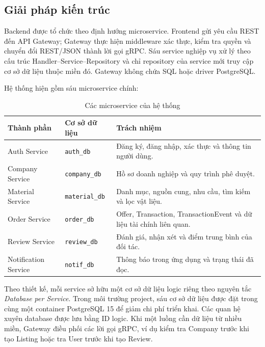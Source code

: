 \documentclass[12pt,a4paper,oneside]{report}
\begin{document}
\subsection{Giải pháp kiến trúc}

Backend được tổ chức theo định hướng microservice. Frontend gửi yêu cầu REST đến
API Gateway; Gateway thực hiện middleware xác thực, kiểm tra quyền và chuyển đổi
REST/JSON thành lời gọi gRPC. Sáu service nghiệp vụ xử lý theo cấu trúc
Handler--Service--Repository và chỉ repository của service mới truy cập cơ sở dữ
liệu thuộc miền đó. Gateway không chứa SQL hoặc driver PostgreSQL.

Hệ thống hiện gồm sáu microservice chính:

\begin{table}[htbp]
  \centering
  \caption{Các microservice của hệ thống}
  \label{tab:danh-sach-microservice}
  \begin{tabularx}{\textwidth}{p{3.4cm}p{2.6cm}Y}
    \toprule
    \textbf{Thành phần} & \textbf{Cơ sở dữ liệu} & \textbf{Trách nhiệm} \\
    \midrule
    Auth Service & \texttt{auth\_db} &
    Đăng ký, đăng nhập, xác thực và thông tin người dùng. \\

    Company Service & \texttt{company\_db} &
    Hồ sơ doanh nghiệp và quy trình phê duyệt. \\

    Material Service & \texttt{material\_db} &
    Danh mục, nguồn cung, nhu cầu, tìm kiếm và lọc vật liệu. \\

    Order Service & \texttt{order\_db} &
    Offer, Transaction, TransactionEvent và dữ liệu tài chính liên quan. \\

    Review Service & \texttt{review\_db} &
    Đánh giá, nhận xét và điểm trung bình của đối tác. \\

    Notification Service & \texttt{notif\_db} &
    Thông báo trong ứng dụng và trạng thái đã đọc. \\
    \bottomrule
  \end{tabularx}
\end{table}

Theo thiết kế, mỗi service sở hữu một cơ sở dữ liệu logic riêng theo nguyên tắc
\textit{Database per Service}. Trong môi trường project, sáu cơ sở dữ liệu được
đặt trong cùng một container PostgreSQL 15 để giảm chi phí triển khai. Các quan
hệ xuyên database được lưu bằng ID logic. Khi một luồng cần dữ liệu từ nhiều
miền, Gateway điều phối các lời gọi gRPC, ví dụ kiểm tra Company trước khi tạo
Listing hoặc tra User trước khi tạo Review.
\end{document}
